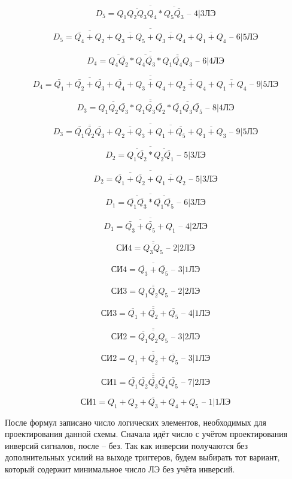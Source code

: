 \documentclass[a4paper,14pt]{article}
\begin{document}
$$ D_5 =\overline{\overline{Q_1 Q_2 Q_3 Q_4} * \overline{Q_5 \bar{Q_3}}} \text{ -- 4|3ЛЭ} $$

$$ D_5 =\overline{\overline{\bar{Q_4} + Q_2 } + \overline{Q_3 + Q_5} + \overline{Q_3 + Q_4} + \overline{Q_1 + Q_4}} \text{ -- 6|5ЛЭ} $$

$$ D_4 =\overline{\overline{Q_4 \bar{Q_2}} * \overline{Q_4 \bar{Q_3}} * \overline{Q_1 \bar{Q_4} Q_3 } } \text{ -- 6|4ЛЭ} $$

$$ D_4 =\overline{\overline{\bar{Q_1} + \bar{Q_2} + \bar{Q_3} + \bar{Q_4}} + \overline{Q_3 + Q_4} + \overline{Q_2 + Q_4} + \overline{{Q_1 + Q_4}}} \text{ -- 9|5ЛЭ} $$

$$ D_3 =\overline{\overline{Q_1 Q_2 \bar{Q_3}} * \overline{Q_1 Q_3 \bar{Q_2}} * \overline{\bar{Q_1} Q_3 \bar{Q_5}}} \text{ -- 8|4ЛЭ} $$

$$ D_3 =\overline{\overline{\bar{Q_1} \bar{Q_2} \bar{Q_3}} + \overline{Q_2 + Q_3} + \overline{Q_1 + \bar{Q_5}} + \overline{Q_1 + Q_3}} \text{ -- 9|5ЛЭ} $$

$$ D_2 =\overline{\overline{Q_1  \bar{Q_2}} * \overline{Q_2  \bar{Q_1}}} \text{ -- 5|3ЛЭ} $$

$$ D_2 =\overline{\overline{\bar{Q_1} + \bar{Q_2}} + \overline{Q_1 + Q_2}} \text{ -- 5|3ЛЭ} $$

$$ D_1 =\overline{\overline{\bar{Q_1}  \bar{Q_3}} * \overline{\bar{Q_1}  \bar{Q_5}}} \text{ -- 6|3ЛЭ} $$

$$ D_1 =\overline{\overline{\bar{Q_3} + \bar{Q_5}} + Q_1} \text{ -- 4|2ЛЭ} $$

$$ \text{СИ4} =\overline{\overline{Q_3Q_5}} \text{ -- 2|2ЛЭ} $$

$$ \text{СИ4} =\overline{\overline{Q_3} + \overline{Q_5}} \text{ -- 3|1ЛЭ} $$

$$ \text{СИ3} =\overline{\overline{Q_1Q_2Q_5}} \text{ -- 2|2ЛЭ} $$

$$ \text{СИ3} =\overline{\overline{Q_1} + \overline{Q_2} + \overline{Q_5}} \text{ -- 4|1ЛЭ} $$

$$ \text{СИ2} =\overline{\overline{\bar{Q_1}Q_2Q_5}} \text{ -- 3|2ЛЭ} $$

$$ \text{СИ2} =\overline{Q_1 + \overline{Q_2} + \overline{Q_5}} \text{ -- 3|1ЛЭ} $$

$$ \text{СИ1} =\overline{\overline{\bar{Q_1}\bar{Q_2}\bar{Q_3}\bar{Q_4}\bar{Q_5}}} \text{ -- 7|2ЛЭ} $$

$$ \text{СИ1} =\overline{Q_1 + Q_2 + Q_3 + Q_4 + Q_5} \text{ -- 1|1ЛЭ} $$

После формул записано число логических элементов, необходимых для проектирования данной схемы.
Сначала идёт число с учётом проектирования инверсий сигналов, после -- без.
Так как инверсии получаются без дополнительных усилий на выходе триггеров, будем выбирать тот вариант, который содержит минимальное число ЛЭ без учёта инверсий.
\end{document}
